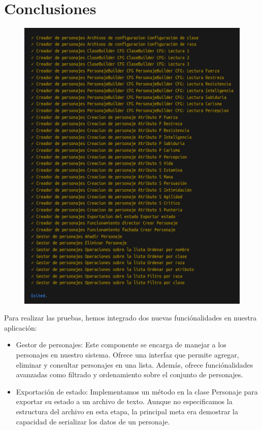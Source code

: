 \documentclass{article}
\begin{document}
\section{Conclusiones}
\begin{figure}
\includegraphics[width=\linewidth]{ejecucion_tests.png}
\end{figure}

Para realizar las pruebas, hemos integrado dos nuevas funciónalidades en nuestra aplicación:

\begin{itemize}
\item[\textendash] Gestor de personajes: Este componente se encarga de manejar a los personajes en nuestro sistema. Ofrece una interfaz que permite agregar, eliminar y consultar personajes en una lista. Además, ofrece funciónalidades avanzadas como filtrado y ordenamiento sobre el conjunto de personajes.


\item[\textendash] Exportación de estado: Implementamos un método en la clase Personaje para exportar su estado a un archivo de texto. Aunque no especificamos la estructura del archivo en esta etapa, la principal meta era demostrar la capacidad de serializar los datos de un personaje.

\end{itemize}
\end{document}
